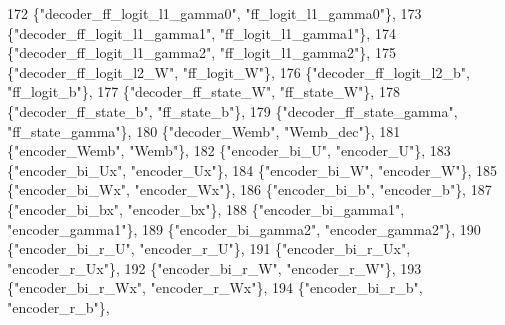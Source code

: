 \begin{DoxyCode}
172            \{\textcolor{stringliteral}{"decoder\_ff\_logit\_l1\_gamma0"}, \textcolor{stringliteral}{"ff\_logit\_l1\_gamma0"}\},
173            \{\textcolor{stringliteral}{"decoder\_ff\_logit\_l1\_gamma1"}, \textcolor{stringliteral}{"ff\_logit\_l1\_gamma1"}\},
174            \{\textcolor{stringliteral}{"decoder\_ff\_logit\_l1\_gamma2"}, \textcolor{stringliteral}{"ff\_logit\_l1\_gamma2"}\},
175            \{\textcolor{stringliteral}{"decoder\_ff\_logit\_l2\_W"}, \textcolor{stringliteral}{"ff\_logit\_W"}\},
176            \{\textcolor{stringliteral}{"decoder\_ff\_logit\_l2\_b"}, \textcolor{stringliteral}{"ff\_logit\_b"}\},
177            \{\textcolor{stringliteral}{"decoder\_ff\_state\_W"}, \textcolor{stringliteral}{"ff\_state\_W"}\},
178            \{\textcolor{stringliteral}{"decoder\_ff\_state\_b"}, \textcolor{stringliteral}{"ff\_state\_b"}\},
179            \{\textcolor{stringliteral}{"decoder\_ff\_state\_gamma"}, \textcolor{stringliteral}{"ff\_state\_gamma"}\},
180            \{\textcolor{stringliteral}{"decoder\_Wemb"}, \textcolor{stringliteral}{"Wemb\_dec"}\},
181            \{\textcolor{stringliteral}{"encoder\_Wemb"}, \textcolor{stringliteral}{"Wemb"}\},
182            \{\textcolor{stringliteral}{"encoder\_bi\_U"}, \textcolor{stringliteral}{"encoder\_U"}\},
183            \{\textcolor{stringliteral}{"encoder\_bi\_Ux"}, \textcolor{stringliteral}{"encoder\_Ux"}\},
184            \{\textcolor{stringliteral}{"encoder\_bi\_W"}, \textcolor{stringliteral}{"encoder\_W"}\},
185            \{\textcolor{stringliteral}{"encoder\_bi\_Wx"}, \textcolor{stringliteral}{"encoder\_Wx"}\},
186            \{\textcolor{stringliteral}{"encoder\_bi\_b"}, \textcolor{stringliteral}{"encoder\_b"}\},
187            \{\textcolor{stringliteral}{"encoder\_bi\_bx"}, \textcolor{stringliteral}{"encoder\_bx"}\},
188            \{\textcolor{stringliteral}{"encoder\_bi\_gamma1"}, \textcolor{stringliteral}{"encoder\_gamma1"}\},
189            \{\textcolor{stringliteral}{"encoder\_bi\_gamma2"}, \textcolor{stringliteral}{"encoder\_gamma2"}\},
190            \{\textcolor{stringliteral}{"encoder\_bi\_r\_U"}, \textcolor{stringliteral}{"encoder\_r\_U"}\},
191            \{\textcolor{stringliteral}{"encoder\_bi\_r\_Ux"}, \textcolor{stringliteral}{"encoder\_r\_Ux"}\},
192            \{\textcolor{stringliteral}{"encoder\_bi\_r\_W"}, \textcolor{stringliteral}{"encoder\_r\_W"}\},
193            \{\textcolor{stringliteral}{"encoder\_bi\_r\_Wx"}, \textcolor{stringliteral}{"encoder\_r\_Wx"}\},
194            \{\textcolor{stringliteral}{"encoder\_bi\_r\_b"}, \textcolor{stringliteral}{"encoder\_r\_b"}\},

\end{DoxyCode}
